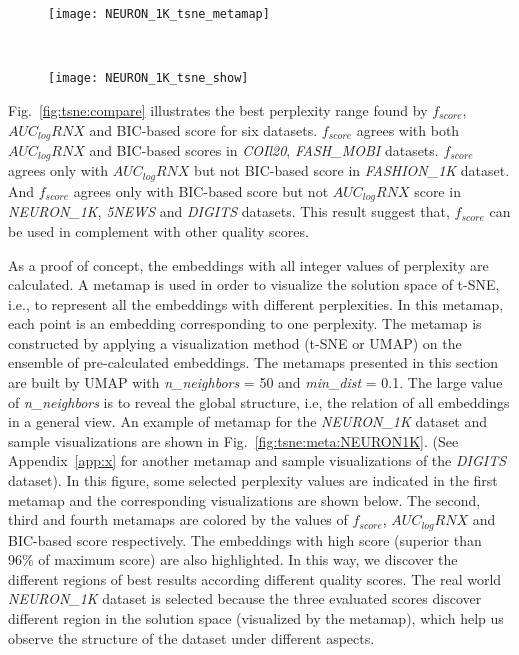 \begin{figure*}[]%
    \centering
    \begin{subfigure}[b]{.8\linewidth}
        \texttt{[image: NEURON\_1K\_tsne\_metamap]}
    \end{subfigure}
    ~
    \begin{subfigure}[b]{.8\linewidth}
        \texttt{[image: NEURON\_1K\_tsne\_show]}
    \end{subfigure}
    \caption{Metamap and sample visualizations for the selected parameters for \emph{NEURON\_1K} dataset.}
    \label{fig:tsne:meta:NEURON1K}
\end{figure*}

Fig.~\ref{fig:tsne:compare} illustrates the best perplexity range found by $f_{score}$, $AUC_{log}RNX$ and BIC-based score for six datasets.
$f_{score}$ agrees with both $AUC_{log}RNX$ and BIC-based scores in \emph{COIl20}, \emph{FASH\_MOBI} datasets.
$f_{score}$ agrees only with $AUC_{log}RNX$ but not BIC-based score in \emph{FASHION\_1K} dataset.
And $f_{score}$ agrees only with BIC-based score but not $AUC_{log}RNX$ score in \emph{NEURON\_1K}, \emph{5NEWS} and \emph{DIGITS} datasets.
This result suggest that, $f_{score}$ can be used in complement with other quality scores.

As a proof of concept, the embeddings with all integer values of perplexity are calculated.
A metamap is used in order to visualize the solution space of t-SNE, i.e., to represent all the embeddings with different perplexities.
In this metamap, each point is an embedding corresponding to one perplexity.
The metamap is constructed by applying a visualization method (t-SNE or UMAP) on the ensemble of pre-calculated embeddings.
The metamaps presented in this section are built by UMAP with \emph{n\_neighbors} = 50 and \emph{min\_dist} = 0.1.
The large value of \emph{n\_neighbors} is to reveal the global structure, i.e, the relation of all embeddings in a general view.
An example of metamap for the \emph{NEURON\_1K} dataset and sample visualizations are shown in Fig.~\ref{fig:tsne:meta:NEURON1K}.
(See Appendix~\ref{app:x} for another metamap and sample visualizations of the \emph{DIGITS} dataset).
In this figure, some selected perplexity values are indicated in the first metamap and the corresponding visualizations are shown below.
The second, third and fourth metamaps are colored by the values of $f_{score}$, $AUC_{log}RNX$ and BIC-based score respectively.
The embeddings with high score (superior than 96\% of maximum score) are also highlighted.
In this way, we discover the different regions of best results according different quality scores.
The real world \emph{NEURON\_1K} dataset is selected because the three evaluated scores discover different region in the solution space (visualized by the metamap), which help us observe the structure of the dataset under different aspects.

